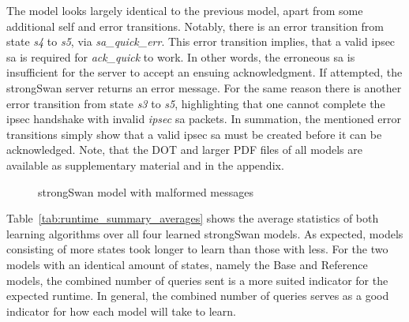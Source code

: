 The model looks largely identical to the previous model, apart from some additional self and error transitions. Notably, there is an error transition from state \emph{s4} to \emph{s5}, via \emph{sa\_quick\_err}. This error transition implies, that a valid \ac{ipsec} \ac{sa} is required for \emph{ack\_quick} to work. In other words, the erroneous \ac{sa} is insufficient for the server to accept an ensuing acknowledgment. If attempted, the strongSwan server returns an error message. For the same reason there is another error transition from state \emph{s3} to \emph{s5}, highlighting that one cannot complete the \ac{ipsec} handshake with invalid \emph{ipsec} \ac{sa} packets. In summation, the mentioned error transitions simply show that a valid \ac{ipsec} \ac{sa} must be created before it can be acknowledged. Note, that the DOT and larger PDF files of all models are available as supplementary material and in the appendix.


\begin{figure}[ht]
	\vspace*{\fill}
	\noindent
	\hspace*{-4.5\oddsidemargin}%
	\caption{strongSwan model with malformed messages}
	\label{fig:withfilterwitherrors}
	\vspace*{\fill}
\end{figure}

Table~\ref{tab:runtime_summary_averages} shows the average statistics of both learning algorithms over all four learned strongSwan models. As expected, models consisting of more states took longer to learn than those with less. For the two models with an identical amount of states, namely the Base and Reference models, the combined number of queries sent is a more suited indicator for the expected runtime. In general, the combined number of queries serves as a good indicator for how each model will take to learn. 

